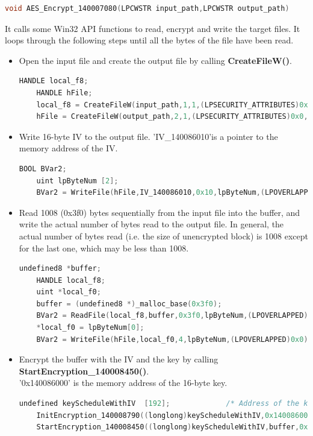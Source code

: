 \documentclass[11pt]{article}
\begin{document}
\begin{lstlisting}[language=c++]
void AES_Encrypt_140007080(LPCWSTR input_path,LPCWSTR output_path)
\end{lstlisting}

It calls some Win32 API functions to read, encrypt and write the target files. It loops through the following steps until all the bytes of the file have been read.

\begin{itemize}
  \item Open the input file and create the output file by calling \textbf{CreateFileW()}.
  \begin{lstlisting}[language=c++]
    HANDLE local_f8;
    HANDLE hFile;
    local_f8 = CreateFileW(input_path,1,1,(LPSECURITY_ATTRIBUTES)0x0,3,0x80,(HANDLE)0x0);
    hFile = CreateFileW(output_path,2,1,(LPSECURITY_ATTRIBUTES)0x0,4,0x80(HANDLE)0x0);\end{lstlisting}
  
  \item Write 16-byte IV to the output file. 'IV\_140086010'is a pointer to the memory address of the IV.
  \begin{lstlisting}[language=c++]
    BOOL BVar2;
    uint lpByteNum [2];
    BVar2 = WriteFile(hFile,IV_140086010,0x10,lpByteNum,(LPOVERLAPPED)0x0)\end{lstlisting}

  \item Read 1008 (0x3f0) bytes sequentially from the input file into the buffer, and write the actual number of bytes read to the output file. In general, the actual number of bytes read (i.e. the size of unencrypted block) is 1008 except for the last one, which may be less than 1008.
  \begin{lstlisting}[language=c++]
    undefined8 *buffer;
    HANDLE local_f8;
    uint *local_f0;
    buffer = (undefined8 *)_malloc_base(0x3f0);
    BVar2 = ReadFile(local_f8,buffer,0x3f0,lpByteNum,(LPOVERLAPPED)0x0);
    *local_f0 = lpByteNum[0];
    BVar2 = WriteFile(hFile,local_f0,4,lpByteNum,(LPOVERLAPPED)0x0);\end{lstlisting}

  \item Encrypt the buffer with the IV and the key by calling \textbf{StartEncryption\_140008450()}. \\'0x140086000' is the memory address of the 16-byte key.
  \begin{lstlisting}[language=c++]
    undefined keyScheduleWithIV  [192];             /* Address of the key*/
    InitEncryption_140008790((longlong)keyScheduleWithIV,0x140086000,(undefined8 *)IV_140086010);
    StartEncryption_140008450((longlong)keyScheduleWithIV,buffer,0x3f0);\end{lstlisting}


\end{itemize}
\end{document}
